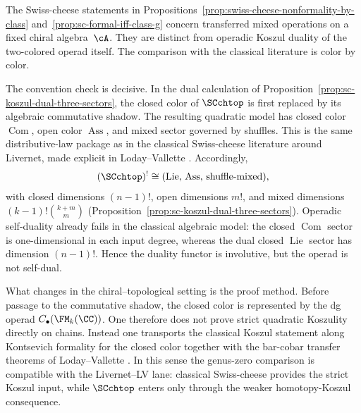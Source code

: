 \begin{remark}
\label{rem:livernet-lv-comparison}
The Swiss-cheese statements in
Propositions~\ref{prop:swiss-cheese-nonformality-by-class}
and~\ref{prop:sc-formal-iff-class-g}
concern transferred mixed operations on a fixed chiral algebra~$\cA$.
They are distinct from operadic Koszul duality of the
two-colored operad itself.
The comparison with the classical literature is color by color.

The convention check is decisive.
In the dual calculation of
Proposition~\ref{prop:sc-koszul-dual-three-sectors},
the closed color of $\SCchtop$ is first replaced by its algebraic
commutative shadow.
The resulting quadratic model has closed color $\operatorname{Com}$,
open color $\operatorname{Ass}$, and mixed sector governed by
shuffles.
This is the same distributive-law package as in the classical
Swiss-cheese literature around Livernet, made explicit in
Loday--Vallette
\cite[\S7.1, Chapter~8, \S13.3]{LV12}.
Accordingly,
\[
(\SCchtop)^! \cong (\mathrm{Lie},\, \mathrm{Ass},\, \text{shuffle-mixed}),
\]
with closed dimensions $(n{-}1)!$, open dimensions $m!$, and mixed
dimensions $(k{-}1)!\binom{k+m}{m}$
\textup{(}Proposition~\ref{prop:sc-koszul-dual-three-sectors}\textup{)}.
Operadic self-duality already fails in the classical algebraic model:
the closed $\operatorname{Com}$ sector is one-dimensional in each
input degree, whereas the dual closed $\operatorname{Lie}$ sector has
dimension $(n{-}1)!$.
Hence the duality functor is involutive, but the operad is not
self-dual.

What changes in the chiral--topological setting is the proof method.
Before passage to the commutative shadow, the closed color is
represented by the dg operad $C_\bullet(\FM_k(\CC))$.
One therefore does not prove strict quadratic Koszulity directly on
chains.
Instead one transports the classical Koszul statement along
Kontsevich formality for the closed color together with the bar-cobar
transfer theorems of Loday--Vallette
\cite[Theorems~11.3.3 and~11.4.1]{LV12}.
In this sense the genus-zero comparison is compatible with the
Livernet--LV lane:
classical Swiss-cheese provides the strict Koszul input, while
$\SCchtop$ enters only through the weaker homotopy-Koszul
consequence.
\end{remark}

